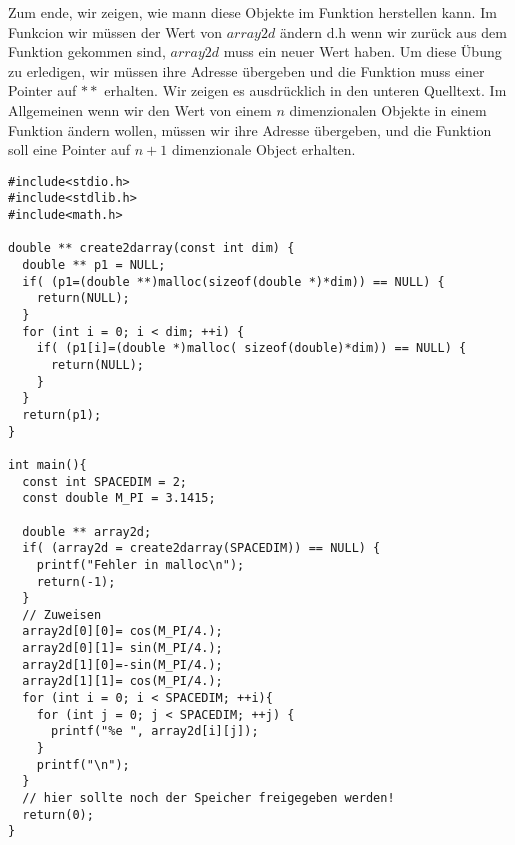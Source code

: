 Zum ende, wir zeigen, wie mann diese Objekte im Funktion herstellen kann.
Im Funkcion wir müssen der Wert von $array2d$ ändern d.h wenn wir zurück
aus dem Funktion gekommen sind, $array2d$ muss ein neuer Wert haben.
Um diese Übung zu erledigen, wir müssen ihre Adresse übergeben und
die Funktion muss einer Pointer auf $**$ erhalten. Wir zeigen 
es ausdrücklich in den unteren Quelltext. Im Allgemeinen 
wenn wir den Wert von einem $n$ dimenzionalen Objekte in einem
Funktion ändern wollen, müssen wir ihre Adresse übergeben, und die Funktion soll
eine Pointer auf $n+1$ dimenzionale Object erhalten.
\begin{lstlisting}
#include<stdio.h>
#include<stdlib.h>
#include<math.h>

double ** create2darray(const int dim) {
  double ** p1 = NULL;
  if( (p1=(double **)malloc(sizeof(double *)*dim)) == NULL) {
    return(NULL);
  }
  for (int i = 0; i < dim; ++i) {
    if( (p1[i]=(double *)malloc( sizeof(double)*dim)) == NULL) {
      return(NULL);
    }
  }
  return(p1);
}

int main(){
  const int SPACEDIM = 2;
  const double M_PI = 3.1415;

  double ** array2d;
  if( (array2d = create2darray(SPACEDIM)) == NULL) {
    printf("Fehler in malloc\n");
    return(-1);
  }
  // Zuweisen
  array2d[0][0]= cos(M_PI/4.); 
  array2d[0][1]= sin(M_PI/4.); 
  array2d[1][0]=-sin(M_PI/4.); 
  array2d[1][1]= cos(M_PI/4.); 
  for (int i = 0; i < SPACEDIM; ++i){
    for (int j = 0; j < SPACEDIM; ++j) {
      printf("%e ", array2d[i][j]);
    }
    printf("\n");
  }
  // hier sollte noch der Speicher freigegeben werden!
  return(0);
}
\end{lstlisting}
